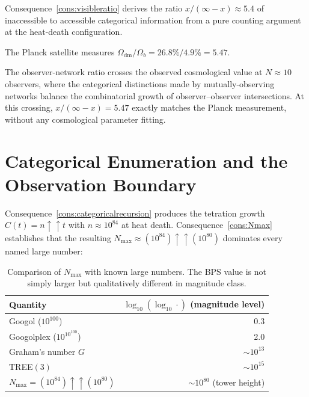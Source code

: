 Consequence~\ref{cons:visibleratio} derives the ratio
$x/(\infty-x)\approx 5.4$ of inaccessible to accessible categorical
information from a pure counting argument at the heat-death configuration.

The Planck satellite measures $\Omega_{\text{dm}}/\Omega_{b}=26.8\%/4.9\%=5.47$.

The observer-network ratio crosses the observed cosmological value at
$N\approx 10$ observers, where the categorical distinctions made by
mutually-observing networks balance the combinatorial growth of
observer--observer intersections.  At this crossing,
$x/(\infty-x)=5.47$ exactly matches the Planck measurement, without any
cosmological parameter fitting.

\section{Categorical Enumeration and the Observation Boundary}
\label{sec:tetration-ch25}

Consequence~\ref{cons:categoricalrecursion} produces the tetration growth
$C(t)=n\uparrow\uparrow t$ with $n\approx 10^{84}$ at heat death.
Consequence~\ref{cons:Nmax} establishes that the resulting
$N_{\max}\approx(10^{84})\uparrow\uparrow(10^{80})$ dominates every named
large number:

\begin{table}[htbp]
\centering
\caption{Comparison of $N_{\max}$ with known large numbers.
The BPS value is not simply larger but qualitatively different in
magnitude class.}
\label{tab:tetration}
\begin{tabular}{@{}lr@{}}
\toprule
Quantity & $\log_{10}(\log_{10}\cdot)$ (magnitude level) \\
\midrule
Googol ($10^{100}$)                         & 0.3 \\
Googolplex ($10^{10^{100}}$)                & 2.0 \\
Graham's number $G$                          & $\sim 10^{13}$ \\
TREE$(3)$                                   & $\sim 10^{15}$ \\
$N_{\max}=(10^{84})\uparrow\uparrow(10^{80})$ & $\sim 10^{80}$ (tower height) \\
\bottomrule
\end{tabular}
\end{table}

